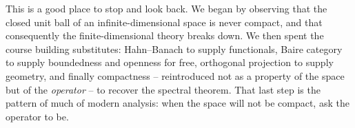 \begin{remark}
	This is a good place to stop and look back. We began by observing that the closed unit ball of an infinite-dimensional space is never compact, and that consequently the finite-dimensional theory breaks down. We then spent the course building substitutes: Hahn--Banach to supply functionals, Baire category to supply boundedness and openness for free, orthogonal projection to supply geometry, and finally compactness -- reintroduced not as a property of the space but of the \emph{operator} -- to recover the spectral theorem. That last step is the pattern of much of modern analysis: when the space will not be compact, ask the operator to be.
\end{remark}

